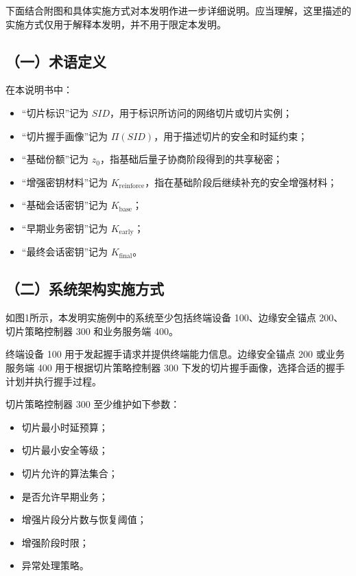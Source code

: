\documentclass[12pt,a4paper]{article}
\newcommand{\Kearly}{K_{\mathrm{early}}}
\newcommand{\Kfinal}{K_{\mathrm{final}}}
\newcommand{\Kbase}{K_{\mathrm{base}}}
\newcommand{\Krein}{K_{\mathrm{reinforce}}}
\begin{document}
下面结合附图和具体实施方式对本发明作进一步详细说明。应当理解，这里描述的实施方式仅用于解释本发明，并不用于限定本发明。

\subsection*{（一）术语定义}

在本说明书中：

\begin{itemize}[leftmargin=2em]
    \item ``切片标识''记为 $SID$，用于标识所访问的网络切片或切片实例；
    \item ``切片握手画像''记为 $\Pi(SID)$，用于描述切片的安全和时延约束；
    \item ``基础份额''记为 $z_0$，指基础后量子协商阶段得到的共享秘密；
    \item ``增强密钥材料''记为 $\Krein$，指在基础阶段后继续补充的安全增强材料；
    \item ``基础会话密钥''记为 $\Kbase$；
    \item ``早期业务密钥''记为 $\Kearly$；
    \item ``最终会话密钥''记为 $\Kfinal$。
\end{itemize}

\subsection*{（二）系统架构实施方式}

如图1所示，本发明实施例中的系统至少包括终端设备 100、边缘安全锚点 200、切片策略控制器 300 和业务服务端 400。

终端设备 100 用于发起握手请求并提供终端能力信息。边缘安全锚点 200 或业务服务端 400 用于根据切片策略控制器 300 下发的切片握手画像，选择合适的握手计划并执行握手过程。

切片策略控制器 300 至少维护如下参数：

\begin{itemize}[leftmargin=2em]
    \item 切片最小时延预算；
    \item 切片最小安全等级；
    \item 切片允许的算法集合；
    \item 是否允许早期业务；
    \item 增强片段分片数与恢复阈值；
    \item 增强阶段时限；
    \item 异常处理策略。
\end{itemize}
\end{document}
